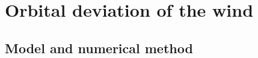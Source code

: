 \documentclass{aa}
\begin{document}
\section{Orbital deviation of the wind}
\label{sec:orb_dev}

\subsection{Model and numerical method}
\label{sec:orb_model}

\end{document}
